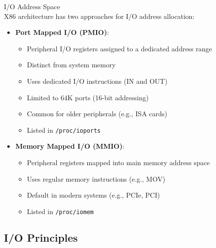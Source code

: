\multend

\begin{definition}{I/O Address Space}\\
    X86 architecture has two approaches for I/O address allocation:
    \begin{itemize}
        \item \textbf{Port Mapped I/O (PMIO)}:
            \begin{itemize}
                \item Peripheral I/O registers assigned to a dedicated address range
                \item Distinct from system memory
                \item Uses dedicated I/O instructions (IN and OUT)
                \item Limited to 64K ports (16-bit addressing)
                \item Common for older peripherals (e.g., ISA cards)
                \item Listed in \texttt{/proc/ioports}
            \end{itemize}
        \item \textbf{Memory Mapped I/O (MMIO)}:
            \begin{itemize}
                \item Peripheral registers mapped into main memory address space
                \item Uses regular memory instructions (e.g., MOV)
                \item Default in modern systems (e.g., PCIe, PCI)
                \item Listed in \texttt{/proc/iomem}
            \end{itemize}
    \end{itemize}
\end{definition}


\subsection{I/O Principles}


